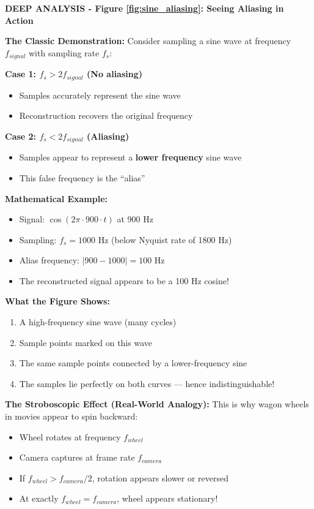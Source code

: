 \documentclass[12pt,a4paper]{article}
\begin{document}
\begin{deepexplanation}
\textbf{DEEP ANALYSIS - Figure \ref{fig:sine_aliasing}: Seeing Aliasing in Action}

\textbf{The Classic Demonstration:}
Consider sampling a sine wave at frequency $f_{signal}$ with sampling rate $f_s$:

\textbf{Case 1: $f_s > 2f_{signal}$ (No aliasing)}
\begin{itemize}
    \item Samples accurately represent the sine wave
    \item Reconstruction recovers the original frequency
\end{itemize}

\textbf{Case 2: $f_s < 2f_{signal}$ (Aliasing)}
\begin{itemize}
    \item Samples appear to represent a \textbf{lower frequency} sine wave
    \item This false frequency is the ``alias''
\end{itemize}

\textbf{Mathematical Example:}
\begin{itemize}
    \item Signal: $\cos(2\pi \cdot 900 \cdot t)$ at 900 Hz
    \item Sampling: $f_s = 1000$ Hz (below Nyquist rate of 1800 Hz)
    \item Alias frequency: $|900 - 1000| = 100$ Hz
    \item The reconstructed signal appears to be a 100 Hz cosine!
\end{itemize}

\textbf{What the Figure Shows:}
\begin{enumerate}
    \item A high-frequency sine wave (many cycles)
    \item Sample points marked on this wave
    \item The same sample points connected by a lower-frequency sine
    \item The samples lie perfectly on both curves --- hence indistinguishable!
\end{enumerate}

\textbf{The Stroboscopic Effect (Real-World Analogy):}
This is why wagon wheels in movies appear to spin backward:
\begin{itemize}
    \item Wheel rotates at frequency $f_{wheel}$
    \item Camera captures at frame rate $f_{camera}$
    \item If $f_{wheel} > f_{camera}/2$, rotation appears slower or reversed
    \item At exactly $f_{wheel} = f_{camera}$, wheel appears stationary!
\end{itemize}
\end{deepexplanation}
\end{document}
